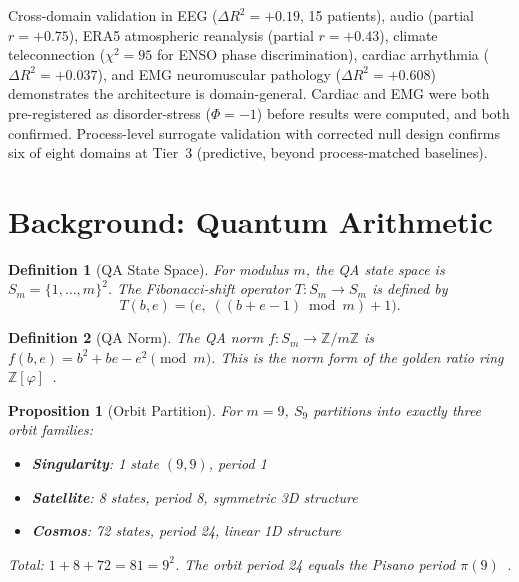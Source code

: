 \documentclass[11pt,a4paper]{article}
\newtheorem{definition}{Definition}
\newtheorem{proposition}{Proposition}
\begin{document}
Cross-domain validation in EEG ($\Delta R^2 = +0.19$, 15 patients),
audio (partial $r = +0.75$), ERA5 atmospheric reanalysis (partial $r = +0.43$),
climate teleconnection ($\chi^2 = 95$ for ENSO phase discrimination),
cardiac arrhythmia ($\Delta R^2 = +0.037$), and EMG neuromuscular pathology
($\Delta R^2 = +0.608$) demonstrates the architecture is domain-general.
Cardiac and EMG were both pre-registered as disorder-stress ($\Phi = -1$)
before results were computed, and both confirmed.
Process-level surrogate validation with corrected null design confirms six
of eight domains at Tier~3 (predictive, beyond process-matched baselines).

\section{Background: Quantum Arithmetic}
\label{sec:qa}

\begin{definition}[QA State Space]
For modulus $m$, the QA state space is $S_m = \{1,\ldots,m\}^2$.
The Fibonacci-shift operator $T: S_m \to S_m$ is defined by
\[
  T(b,e) = \bigl(e,\; ((b+e-1) \bmod m) + 1\bigr).
\]
\end{definition}

\begin{definition}[QA Norm]
The QA norm $f: S_m \to \mathbb{Z}/m\mathbb{Z}$ is
$f(b,e) = b^2 + be - e^2 \pmod{m}$.
This is the norm form of the golden ratio ring $\mathbb{Z}[\varphi]$~\cite{iverson2}.
\end{definition}

\begin{proposition}[Orbit Partition]
For $m = 9$, $S_9$ partitions into exactly three orbit families:
\begin{itemize}
  \item \textbf{Singularity}: 1 state $(9,9)$, period 1
  \item \textbf{Satellite}: 8 states, period 8, symmetric 3D structure
  \item \textbf{Cosmos}: 72 states, period 24, linear 1D structure
\end{itemize}
Total: $1 + 8 + 72 = 81 = 9^2$. The orbit period 24 equals the
Pisano period $\pi(9)$~\cite{wall1960}.
\end{proposition}

\end{document}
